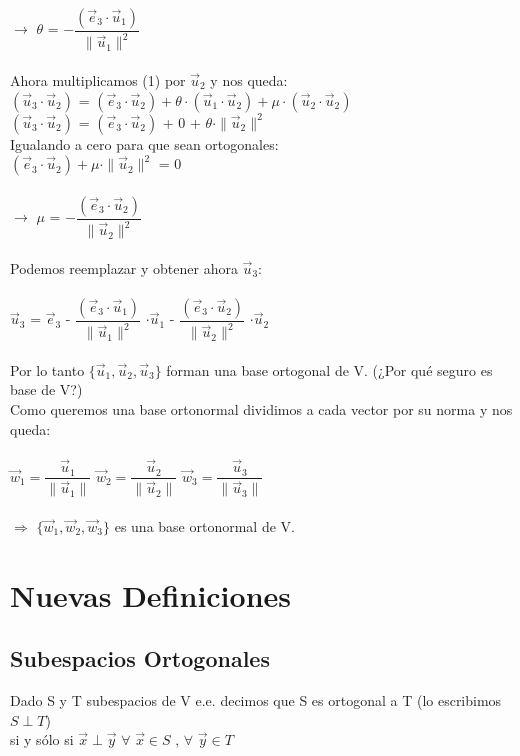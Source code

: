 \documentclass[11pt]{article}
\begin{document}
$\rightarrow$ $\theta$ = $- \dfrac{(\vec{e}_3\cdot\vec{u}_1)}{\parallel\vec{u}_1\parallel^2}$\\\\
Ahora multiplicamos (1) por $\vec{u}_2$ y nos queda:\\
$(\vec{u}_3\cdot\vec{u}_2)$ = $(\vec{e}_3\cdot\vec{u}_2) + \theta\cdot(\vec{u}_1\cdot\vec{u}_2) + \mu \cdot (\vec{u}_2\cdot\vec{u}_2)$ \\
$(\vec{u}_3\cdot\vec{u}_2)$ = $(\vec{e}_3\cdot\vec{u}_2)$ + 0 + $\theta\cdot\parallel\vec{u}_2\parallel^2$\\
Igualando a cero para que sean ortogonales: \\
$(\vec{e}_3\cdot\vec{u}_2) + \mu\cdot\parallel\vec{u}_2\parallel^2$ = 0\\\\
$\rightarrow$ $\mu$ = $- \dfrac{(\vec{e}_3\cdot\vec{u}_2)}{\parallel\vec{u}_2\parallel^2}$\\\\
Podemos reemplazar y obtener ahora $\vec{u}_3$: \\\\
$\vec{u}_3$ = $\vec{e}_3$ - $\dfrac{(\vec{e}_3\cdot\vec{u}_1)}{\parallel\vec{u}_1\parallel^2}$ $\cdot\vec{u}_1$ - $\dfrac{(\vec{e}_3\cdot\vec{u}_2)}{\parallel\vec{u}_2\parallel^2}$ $\cdot\vec{u}_2$  \\\\
Por lo tanto $\{\vec{u}_1,\vec{u}_2,\vec{u}_3\}$ forman una base ortogonal de V. (¿Por qué seguro es base de V?)\\
Como queremos una base ortonormal dividimos a cada vector por su norma y nos queda: \\\\
$\vec{w}_1 = \dfrac{\vec{u}_1}{\parallel\vec{u}_1\parallel}$\indent 
$\vec{w}_2 = \dfrac{\vec{u}_2}{\parallel\vec{u}_2\parallel}$\indent 
$\vec{w}_3 = \dfrac{\vec{u}_3}{\parallel\vec{u}_3\parallel}$ \\\\
$\Rightarrow$ $\{\vec{w}_1,\vec{w}_2,\vec{w}_3\}$ es una base ortonormal de V.
\section{Nuevas Definiciones}
\subsection{Subespacios Ortogonales}
Dado S y T subespacios de V e.e. decimos que S es ortogonal a T (lo escribimos $S \perp T$)\\ si y sólo si $\vec{x} \perp \vec{y}$  $\forall$ $\vec{x} \in S$ , $\forall$ $\vec{y} \in T$
\end{document}
